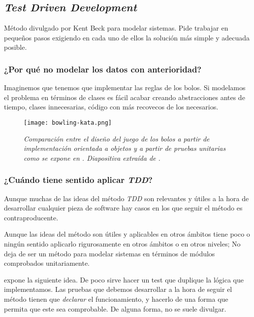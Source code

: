 \subsection{\textit{Test Driven Development}}

Método divulgado por Kent Beck \cite{TDD} para modelar sistemas.
Pide trabajar en pequeños pasos exigiendo en cada uno de ellos
la solución más simple y adecuada posible.

\subsubsection{¿Por qué no modelar los datos con anterioridad?}

Imaginemos que tenemos que implementar las reglas de los bolos.
Si modelamos el problema en términos de clases es fácil acabar 
creando abstracciones antes de tiempo, clases innecesarias,
código con más recovecos de los necesarios.

\begin{figure}[!h]
    \centering
    \texttt{[image: bowling-kata.png]}
    \caption{\textit{Comparación entre el diseño del juego de
    los bolos a partir de implementación orientada a objetos
    y a partir de pruebas unitarias como se expone en \cite{TDD}.
    Diapositiva extraída de \cite{BowlingKata}.}}
\end{figure}

\subsubsection{¿Cuándo tiene sentido aplicar \textit{TDD}?}

Aunque muchas de las ideas del método \textit{TDD} son relevantes
y útiles a la hora de desarrollar cualquier pieza de software hay casos
en los que seguir el método es contraproducente.

Aunque las ideas del método son útiles y aplicables en otros ámbitos
tiene poco o ningún sentido aplicarlo rigurosamente en otros ámbitos o
en otros niveles; No deja de ser un método para modelar sistemas en
términos de módulos comprobados unitariamente.

\cite{TDD} expone la siguiente idea.
De poco sirve hacer un test que duplique la lógica que implementamos. Las
pruebas que debemos desarrollar a la hora de seguir el método tienen que
\textit{declarar} el funcionamiento, y hacerlo de una forma que permita que
este sea comprobable. De alguna forma, no se suele divulgar.

